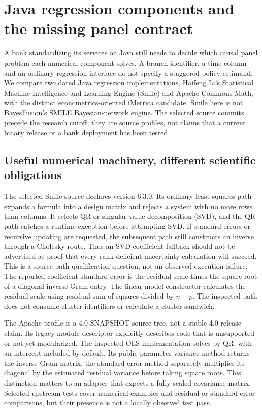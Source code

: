 
\section{Java regression components and the missing panel contract}
\label{sec:exec25-panels-java}
A bank standardizing its services on Java still needs to decide which causal
panel problem each numerical component solves. A branch identifier, a time
column and an ordinary regression interface do not specify a staggered-policy
estimand. We compare two dated Java regression implementations, Haifeng Li's
Statistical Machine Intelligence and Learning Engine (Smile) and Apache
Commons Math, with the distinct econometrics-oriented iMetrica candidate.
Smile here is not BayesFusion's SMILE Bayesian-network engine. The selected
source commits precede the research cutoff; they are source profiles, not
claims that a current binary release or a bank deployment has been tested.
\citep{exec25_paneljava_smile,exec25_paneljava_commons,exec25_paneljava_imetrica}

\subsection{Useful numerical machinery, different scientific obligations}
The selected Smile source declares version 6.3.0. Its ordinary least-squares
path expands a formula into a design matrix and rejects a system with no more
rows than columns. It selects QR or singular-value decomposition (SVD), and
the QR path catches a runtime exception before attempting SVD. If standard
errors or recursive updating are requested, the subsequent path still constructs
an inverse through a Cholesky route. Thus an SVD coefficient fallback should
not be advertised as proof that every rank-deficient uncertainty calculation
will succeed. This is a source-path qualification question, not an observed
execution failure. The reported coefficient standard error is the residual
scale times the square root of a diagonal inverse-Gram entry. The linear-model
constructor calculates the residual scale using residual sum of squares divided
by $n-p$. The inspected path does not consume cluster identifiers or calculate
a cluster sandwich.~\citep{exec25_paneljava_smile}

The Apache profile is a 4.0-SNAPSHOT source tree, not a stable 4.0 release
claim. Its legacy-module descriptor explicitly describes code that is unsupported
or not yet modularized. The inspected OLS implementation solves by QR, with
an intercept included by default. Its public parameter-variance method returns
the inverse Gram matrix; the standard-error method separately multiplies its
diagonal by the estimated residual variance before taking square roots. This
distinction matters to an adapter that expects a fully scaled covariance matrix.
Selected upstream tests cover numerical examples and residual or standard-error
comparisons, but their presence is not a locally observed test pass.
\citep{exec25_paneljava_commons}

